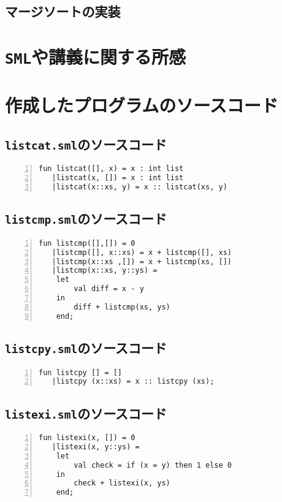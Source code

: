 \documentclass[autodetect-engine,dvi=dvipdfmx,ja=standard,
               a4j,11pt]{bxjsarticle}
\begin{document}
\subsection{マージソートの実装}\label{mergesort}
\section{\texttt{SML}や講義に関する所感}

\section{作成したプログラムのソースコード} \label{code}
\subsection{\texttt{listcat.sml}のソースコード} \label{listcat_code}
\begin{Verbatim}[numbers=left, xleftmargin=8mm, numbersep=6pt,
    fontsize=\small, baselinestretch=0.8]
fun listcat([], x) = x : int list
   |listcat(x, []) = x : int list
   |listcat(x::xs, y) = x :: listcat(xs, y)
\end{Verbatim}
\subsection{\texttt{listcmp.sml}のソースコード} \label{listcmp_code}
\begin{Verbatim}[numbers=left, xleftmargin=8mm, numbersep=6pt,
    fontsize=\small, baselinestretch=0.8]
fun listcmp([],[]) = 0
   |listcmp([], x::xs) = x + listcmp([], xs)
   |listcmp(x::xs ,[]) = x + listcmp(xs, [])
   |listcmp(x::xs, y::ys) = 
    let
        val diff = x - y
    in
        diff + listcmp(xs, ys)
    end;
\end{Verbatim}
\subsection{\texttt{listcpy.sml}のソースコード} \label{listcpy_code}
\begin{Verbatim}[numbers=left, xleftmargin=8mm, numbersep=6pt,
    fontsize=\small, baselinestretch=0.8]
fun listcpy [] = []
   |listcpy (x::xs) = x :: listcpy (xs);
\end{Verbatim}
\subsection{\texttt{listexi.sml}のソースコード} \label{listexi_code}
\begin{Verbatim}[numbers=left, xleftmargin=8mm, numbersep=6pt,
    fontsize=\small, baselinestretch=0.8]
fun listexi(x, []) = 0
   |listexi(x, y::ys) = 
    let
        val check = if (x = y) then 1 else 0
    in
        check + listexi(x, ys)
    end;
\end{Verbatim}
\end{document}
